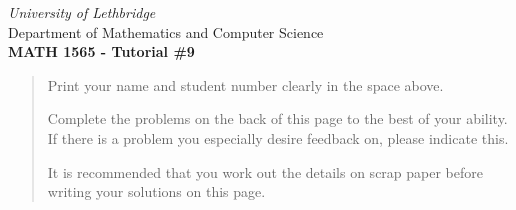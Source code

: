 \documentclass[12pt]{article}
\newcommand{\skipline}{\vspace{12pt}}
\begin{document}
\author{Instructor: Sean Fitzpatrick}
\thispagestyle{empty}
\begin{center}
\emph{University of Lethbridge}\\
Department of Mathematics and Computer Science\\
{\bf MATH 1565 - Tutorial \#9}\\
\end{center}



\vspace{0.1in}

\vspace*{\fill}

\begin{quote}
Print your name and student number clearly in the space above. 

\medskip

Complete the problems on the back of this page to the best of your ability. If there is a problem you especially desire feedback on, please indicate this. 

\medskip

It is recommended that you work out the details on scrap paper before writing your solutions on this page.
\end{quote}
\newpage
\end{document}
